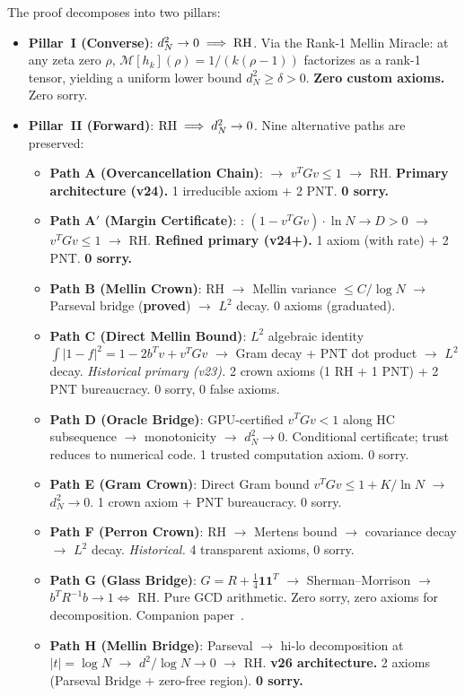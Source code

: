 \documentclass[11pt,a4paper]{article}
\begin{document}
\noindent
The proof decomposes into two pillars:
\begin{itemize}
  \item \textbf{Pillar~I (Converse)}: $d_N^2 \to 0 \implies \mathrm{RH}$.
    Via the Rank-1 Mellin Miracle: at any zeta zero $\rho$,
    $\mathcal{M}[h_k](\rho) = 1/(k(\rho-1))$ factorizes as a rank-1
    tensor, yielding a uniform lower bound $d_N^2 \geq \delta > 0$.
    \textbf{Zero custom axioms.} Zero sorry.
  \item \textbf{Pillar~II (Forward)}: $\mathrm{RH} \implies d_N^2 \to 0$.
    Nine alternative paths are preserved:
    \begin{itemize}
      \item \textbf{Path A (Overcancellation Chain)}:
         $\to$
        $v^T G v \leq 1$ $\to$ RH.
        \textbf{Primary architecture (v24).}
        1 irreducible axiom + 2 PNT. \textbf{0 sorry.}
      \item \textbf{Path A$'$ (Margin Certificate)}:
        :
        $(1 - v^T G v) \cdot \ln N \to D > 0$ $\to$
        $v^T G v \leq 1$ $\to$ RH.
        \textbf{Refined primary (v24+).}
        1 axiom (with rate) + 2 PNT. \textbf{0 sorry.}
      \item \textbf{Path B (Mellin Crown)}: RH $\to$ Mellin variance
        $\le C/\log N$ $\to$ Parseval bridge (\textbf{proved})
        $\to$ $L^2$ decay. 0 axioms (graduated).
      \item \textbf{Path C (Direct Mellin Bound)}: $L^2$ algebraic
        identity $\int|1-f|^2 = 1 - 2b^Tv + v^TGv$ $\to$
        Gram decay + PNT dot product $\to$ $L^2$ decay.
        \emph{Historical primary (v23).}
        2 crown axioms (1 RH + 1 PNT) + 2 PNT bureaucracy.
        0 sorry, 0 false axioms.
      \item \textbf{Path D (Oracle Bridge)}: GPU-certified
        $v^T G v < 1$ along HC subsequence $\to$
        monotonicity $\to$ $d_N^2 \to 0$.
        Conditional certificate; trust reduces to numerical code.
        1 trusted computation axiom. 0 sorry.
      \item \textbf{Path E (Gram Crown)}: Direct Gram bound
        $v^T G v \leq 1 + K/\ln N$ $\to$ $d_N^2 \to 0$.
        1 crown axiom + PNT bureaucracy. 0 sorry.
      \item \textbf{Path F (Perron Crown)}: RH $\to$ Mertens bound
        $\to$ covariance decay $\to$ $L^2$ decay.
        \emph{Historical.} 4 transparent axioms, 0 sorry.
      \item \textbf{Path G (Glass Bridge)}: $G = R + \tfrac{1}{4}\mathbf{1}\mathbf{1}^T$
        $\to$ Sherman--Morrison $\to$ $b^T R^{-1}b \to 1 \Leftrightarrow$ RH.
        Pure GCD arithmetic. Zero sorry, zero axioms for decomposition.
        Companion paper~\cite{glasspaper}.
      \item \textbf{Path H (Mellin Bridge)}: Parseval $\to$
        hi-lo decomposition at $|t| = \log N$ $\to$
        $d^2/\log N \to 0$ $\to$ RH.
        \textbf{v26 architecture.}
        2 axioms (Parseval Bridge + zero-free region). \textbf{0 sorry.}
    \end{itemize}
\end{itemize}
\end{document}
